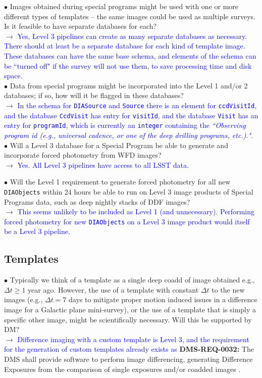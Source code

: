 \documentclass[DM,lsstdraft,toc]{lsstdoc}
\begin{document}
$\bullet$ Images obtained during special programs might be used with one or more different types of templates -- the same images could be used as multiple surveys. Is it feasible to have separate databases for each? \\ 
$\rightarrow$ \textcolor{blue}{Yes, Level 3 pipelines can create as many separate databases as necessary. There should at least be a separate database for each kind of template image. These databases can have the same base schema, and elements of the schema can be ``turned off" if the survey will not use them, to save processing time and disk space.} \\

$\bullet$ Data from special programs might be incorporated into the Level 1 and/or 2 databases; if so, how will it be flagged in these databases? \\
$\rightarrow$  \textcolor{blue}{In the schema for {\tt DIASource} and {\tt Source} there is an element for {\tt ccdVisitId}, and the database {\tt CcdVisit} has entry for {\tt visitId}, and the database {\tt Visit} has an entry for {\tt programId}, which is currently an {\tt integer} containing the {\it ``Observing program id (e.g., universal cadence, or one of the deep drilling programs, etc.)."}.} \\

$\bullet$ Will a Level 3 database for a Special Program be able to generate and incorporate forced photometry from WFD images? \\
$\rightarrow$ \textcolor{blue}{Yes. All Level 3 pipelines have access to all LSST data.}

$\bullet$ Will the Level 1 requirement to generate forced photometry for all new {\tt DIAObjects} within 24 hours be able to run on Level 3 image products of Special Programs data, such as deep nightly stacks of DDF images? \\
$\rightarrow$ \textcolor{blue}{This seems unlikely to be included as Level 1 (and unnecessary). Performing forced photometry for new {\tt DIAObjects} on a Level 3 image product would itself be a Level 3 pipeline.}


\subsection{Templates}\label{ssec:issues_templates}

$\bullet$ Typically we think of a template as a single deep coadd of image obtained e.g., $\Delta t \geq 1$ year ago. However, the use of a template with constant $\Delta t$ to the new images (e.g., $\Delta t = 7$ days to mitigate proper motion induced issues in a difference image for a Galactic plane mini-survey), or the use of a template that is simply a specific other image, might be scientifically necessary. Will this be supported by DM? \\
$\rightarrow$ \textcolor{blue}{Difference imaging with a custom template is Level 3, and the requirement for the generation of custom templates already exists as} \textbf{DMS-REQ-0032:} The DMS shall provide software to perform image differencing, generating Difference Exposures from the comparison of single exposures and/or coadded images \citep{LSE-61}.
\end{document}
